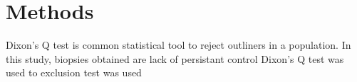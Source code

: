 \chapter{Methods}

Dixon's Q test is common statistical tool to reject outliners in a population. In this study, biopsies obtained are lack of persistant control  Dixon's Q test was used to   exclusion test was used 